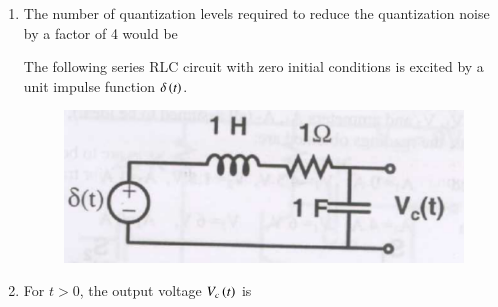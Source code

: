 \documentclass[a4paper, 11pt]{article}
\begin{document}
\begin{enumerate}
    \hfill{}

    \item The number of quantization levels required to reduce the quantization noise by a factor of 4 would be
    \begin{enumerate}
    \end{enumerate}
    
    \hfill{}

    The following series RLC circuit with zero initial conditions is excited by a unit impulse function $\delta\left(t\right)$.
    \begin{figure}[H]
        \centering
        \includegraphics[width=0.5\columnwidth]{figs/q74.png}
        \caption*{}
        \label{fig:q74}
    \end{figure}
    \item For $t>0$, the output voltage $V_c\left(t\right)$ is
    \begin{enumerate}
    \end{enumerate}
    
    \hfill{}
    

\end{enumerate}
\end{document}
